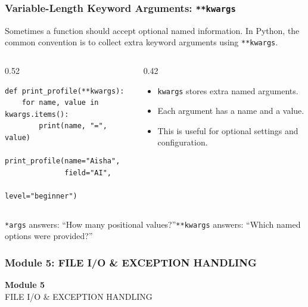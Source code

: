 \documentclass[aspectratio=169,10pt]{beamer}
\newcommand{\codeword}[1]{\texttt{#1}}
\begin{document}
\begin{frame}[fragile]
\frametitle{Variable-Length Keyword Arguments: \texttt{**kwargs}}
\small
Sometimes a function should accept optional named information. In Python, the common convention is to collect extra keyword arguments using \codeword{**kwargs}.

\vspace{0.18cm}
\begin{columns}[T,totalwidth=0.96\textwidth]
\begin{column}{0.52\textwidth}
\begin{lstlisting}[style=pycode]
def print_profile(**kwargs):
    for name, value in kwargs.items():
        print(name, "=", value)

print_profile(name="Aisha",
              field="AI",
              level="beginner")
\end{lstlisting}
\end{column}
\begin{column}{0.42\textwidth}
\begin{tcolorbox}[lecturebox,title=What happens?]
\begin{itemize}\setlength\itemsep{0.06cm}
  \item \codeword{kwargs} stores extra named arguments.
  \item Each argument has a name and a value.
  \item This is useful for optional settings and configuration.
\end{itemize}
\end{tcolorbox}
\end{column}
\end{columns}

\begin{tcolorbox}[lecturebox,title=How to read it]
\codeword{*args} answers: ``How many positional values?''\quad \codeword{**kwargs} answers: ``Which named options were provided?''
\end{tcolorbox}
\end{frame}

\begin{noheadline}
\begin{frame}
\frametitle{Module 5: FILE I/O \& EXCEPTION HANDLING}
\vspace{1.2cm}
\begin{center}
  {\fontsize{30}{36}\selectfont\textbf{Module 5}}\\[0.35cm]
  {\fontsize{25}{30}\selectfont FILE I/O \& EXCEPTION HANDLING}\\[0.7cm]
\end{center}
\end{frame}
\end{noheadline}
\end{document}
